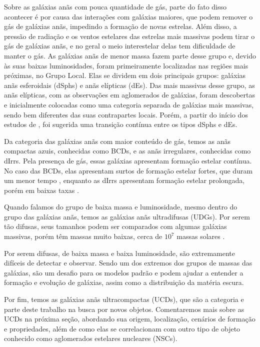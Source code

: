 Sobre as galáxias anãs com pouca quantidade de gás, parte do fato disso acontecer é por causa das interações com galáxias maiores, que podem remover o gás de galáxias anãs, impedindo a formação de novas estrelas. Além disso, a pressão de radiação e os ventos estelares das estrelas mais massivas podem tirar o gás de galáxias anãs, e no geral o meio interestelar delas tem dificuldade de manter o gás. As galáxias anãs de menor massa fazem parte desse grupo e, devido às suas baixas luminosidades, foram primeiramente localizadas nas regiões mais próximas, no Grupo Local. Elas se dividem em dois principais grupos: galáxias anãs esferoidais (dSphs) e anãs elípticas (dEs). Das mais massivas desse grupo, as anãs elípticas, com as observações em aglomerados de galáxias, foram descobertas e inicialmente colocadas como uma categoria separada de galáxias mais massivas, sendo bem diferentes das suas contrapartes locais. Porém, a partir do início dos estudos de \cite{Forbes_2011}, foi sugerida uma transição contínua entre os tipos dSphs e dEs.

Da categoria das galáxias anãs com maior conteúdo de gás, temos as anãs compactas azuis, conhecidas como BCDs, e as anãs irregulares, conhecidas como dIrrs. Pela presença de gás, essas galáxias apresentam formação estelar contínua. No caso das BCDs, elas apresentam surtos de formação estelar fortes, que duram um menor tempo \citep{Thornley2000}, enquanto as dIrrs apresentam formação estelar prolongada, porém em baixas taxas \citep{McQuinn2010}.

Quando falamos do grupo de baixa massa e luminosidade, mesmo dentro do grupo das galáxias anãs, temos as galáxias anãs ultradifusas (UDGs). Por serem tão difusas, seus tamanhos podem ser comparados com algumas galáxias massivas, porém têm massas muito baixas, cerca de $10^7$ massas solares \citep{van_Dokkum2015}. 

Por serem difusas, de baixa massa e baixa luminosidade, são extremamente difíceis de detectar e observar. Sendo um dos extremos dos grupos de massas das galáxias, são um desafio para os modelos padrão e podem ajudar a entender a formação e evolução de galáxias, assim como a distribuição da matéria escura.

Por fim, temos as galáxias anãs ultracompactas (UCDs), que são a categoria e parte deste trabalho na busca por novos objetos. Comentaremos mais sobre as UCDs na próxima seção, abordando sua origem, localização, cenários de formação e propriedades, além de como elas se correlacionam com outro tipo de objeto conhecido como aglomerados estelares nucleares (NSCs).

